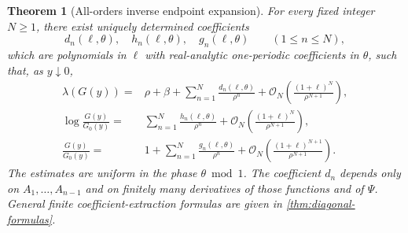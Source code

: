 \documentclass[11pt,oneside]{article}
\numberwithin{equation}{section}
\newtheorem{theorem}{Theorem}[section]
\theoremstyle{definition}
\theoremstyle{remark}
\newcommand{\cO}{\mathcal O}
\newcommand{\Gzero}{G_0}
\begin{document}
\begin{theorem}[All-orders inverse endpoint expansion]
\label{thm:all-orders}
For every fixed integer $N\ge1$, there exist uniquely determined coefficients
\begin{equation}
 d_n(\ell,\theta),\quad h_n(\ell,\theta),\quad g_n(\ell,\theta)
 \qquad(1\le n\le N),
 \label{eq:coefficient-families}
\end{equation}
which are polynomials in $\ell$ with real-analytic one-periodic coefficients in $\theta$, such that, as $y\downarrow0$,
\begin{align}
 \lambda(G(y))={}&\rho+\beta+
 \sum_{n=1}^{N}\frac{d_n(\ell,\theta)}{\rho^n}
 +\cO_N\!\left(\frac{(1+\ell)^N}{\rho^{N+1}}\right),
 \label{eq:phase-all-orders}\\
 \log\frac{G(y)}{\Gzero(y)}={}&
 \sum_{n=1}^{N}\frac{h_n(\ell,\theta)}{\rho^n}
 +\cO_N\!\left(\frac{(1+\ell)^N}{\rho^{N+1}}\right),
 \label{eq:logG-all-orders}\\
 \frac{G(y)}{\Gzero(y)}={}&1+
 \sum_{n=1}^{N}\frac{g_n(\ell,\theta)}{\rho^n}
 +\cO_N\!\left(\frac{(1+\ell)^{N+1}}{\rho^{N+1}}\right).
 \label{eq:G-all-orders}
\end{align}
The estimates are uniform in the phase $\theta\bmod1$.  The coefficient $d_n$ depends only on $A_1,\ldots,A_{n-1}$ and on finitely many derivatives of those functions and of $\Psi$.  General finite coefficient-extraction formulas are given in \cref{thm:diagonal-formulas}.
\end{theorem}
\end{document}
